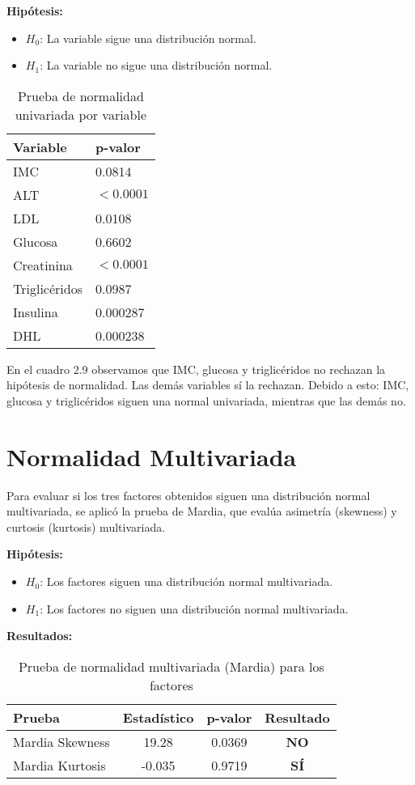 \documentclass[12pt]{report}
\begin{document}
\textbf{Hipótesis:}
\begin{itemize}
    \item $H_0$: La variable sigue una distribución normal.
    \item $H_1$: La variable no sigue una distribución normal.
\end{itemize}

\begin{table}[H]
\centering
\begin{tabular}{ll}
\toprule
\textbf{Variable} & \textbf{p-valor} \\
\midrule
IMC & 0.0814 \\
ALT & $< 0.0001$ \\
LDL & 0.0108 \\
Glucosa & 0.6602 \\
Creatinina & $< 0.0001$ \\
Triglicéridos & 0.0987 \\
Insulina & 0.000287 \\
DHL & 0.000238 \\
\bottomrule
\end{tabular}
\caption{Prueba de normalidad univariada por variable}
\end{table}

\noindent En el cuadro 2.9 observamos que IMC, glucosa y triglicéridos no rechazan la hipótesis de normalidad. Las demás variables sí la rechazan. Debido a esto: IMC, glucosa y triglicéridos siguen una normal univariada, mientras que las demás no.
\newpage
\section{Normalidad Multivariada}
Para evaluar si los tres factores obtenidos siguen una distribución normal multivariada, se aplicó la prueba de Mardia, que evalúa asimetría (skewness) y curtosis (kurtosis) multivariada.

\textbf{Hipótesis:}
\begin{itemize}
    \item $H_0$: Los factores siguen una distribución normal multivariada.
    \item $H_1$: Los factores no siguen una distribución normal multivariada.
\end{itemize}

\textbf{Resultados:}
\begin{table}[H]
\centering
\begin{tabular}{|l|c|c|c|}
\hline
\textbf{Prueba} & \textbf{Estadístico} & \textbf{p-valor} & \textbf{Resultado} \\
\hline
Mardia Skewness & 19.28 & 0.0369 & \textbf{NO} \\
Mardia Kurtosis & -0.035 & 0.9719 & \textbf{SÍ} \\
\hline
\end{tabular}
\caption{Prueba de normalidad multivariada (Mardia) para los factores}
\end{table}
\end{document}
